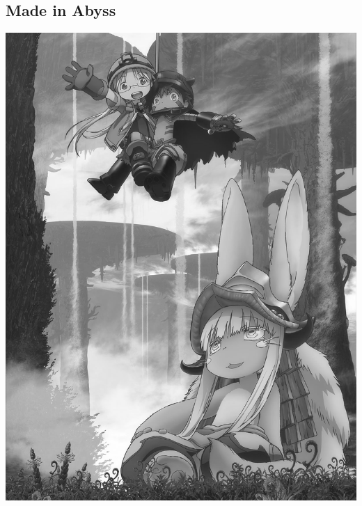 \documentclass[a4paper,10pt,twocolumn,oneside]{article}
\begin{document}
\subsection{Made in Abyss}
\includegraphics[width=7in]{../images/miabyss}
\end{document}
